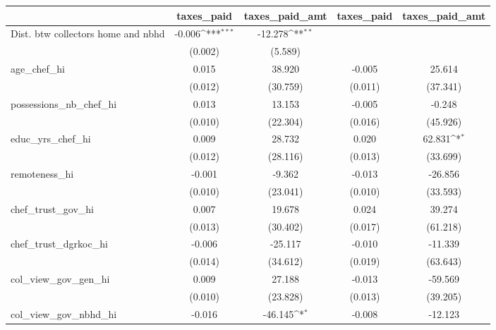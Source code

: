 {
\def\sym#1{\ifmmode^{#1}\else\(^{#1}\)\fi}
\begin{tabular}{l*{4}{c}}
\hline\hline
                &\multicolumn{1}{c}{taxes\_paid}&\multicolumn{1}{c}{taxes\_paid\_amt}&\multicolumn{1}{c}{taxes\_paid}&\multicolumn{1}{c}{taxes\_paid\_amt}\\
\hline
Dist. btw collectors home and nbhd&   -0.006\sym{***}&  -12.278\sym{**} &                  &                  \\
                &  (0.002)         &  (5.589)         &                  &                  \\
age\_chef\_hi     &    0.015         &   38.920         &   -0.005         &   25.614         \\
                &  (0.012)         & (30.759)         &  (0.011)         & (37.341)         \\
possessions\_nb\_chef\_hi&    0.013         &   13.153         &   -0.005         &   -0.248         \\
                &  (0.010)         & (22.304)         &  (0.016)         & (45.926)         \\
educ\_yrs\_chef\_hi&    0.009         &   28.732         &    0.020         &   62.831\sym{*}  \\
                &  (0.012)         & (28.116)         &  (0.013)         & (33.699)         \\
remoteness\_hi   &   -0.001         &   -9.362         &   -0.013         &  -26.856         \\
                &  (0.010)         & (23.041)         &  (0.010)         & (33.593)         \\
chef\_trust\_gov\_hi&    0.007         &   19.678         &    0.024         &   39.274         \\
                &  (0.013)         & (30.402)         &  (0.017)         & (61.218)         \\
chef\_trust\_dgrkoc\_hi&   -0.006         &  -25.117         &   -0.010         &  -11.339         \\
                &  (0.014)         & (34.612)         &  (0.019)         & (63.643)         \\
col\_view\_gov\_gen\_hi&    0.009         &   27.188         &   -0.013         &  -59.569         \\
                &  (0.010)         & (23.828)         &  (0.013)         & (39.205)         \\
col\_view\_gov\_nbhd\_hi&   -0.016         &  -46.145\sym{*}  &   -0.008         &  -12.123         \\

\end{tabular}}
